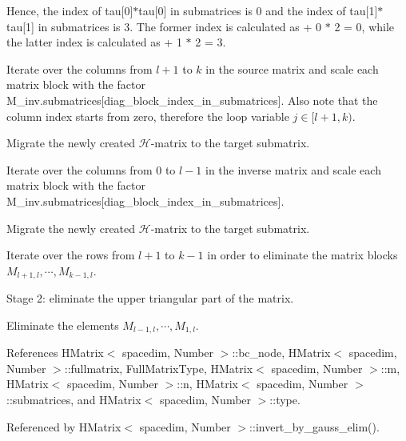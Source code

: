 Hence, the index of {\ttfamily tau}\mbox{[}0\mbox{]}$\ast$tau\mbox{[}0\mbox{]} in {\ttfamily submatrices} is 0 and the index of {\ttfamily tau}\mbox{[}1\mbox{]}$\ast$tau\mbox{[}1\mbox{]} in {\ttfamily submatrices} is 3. The former index is calculated as { + 0 $\ast$ 2 = 0}, while the latter index is calculated as { + 1 $\ast$ 2 = 3}.

Iterate over the columns from $l + 1$ to $k$ in the source matrix and scale each matrix block with the factor {\ttfamily M\+\_\+inv.\+submatrices}\mbox{[}diag\+\_\+block\+\_\+index\+\_\+in\+\_\+submatrices\mbox{]}. Also note that the column index starts from zero, therefore the loop variable $j \in [l+1, k)$.

Migrate the newly created $\mathcal{H}$-\/matrix to the target submatrix.

Iterate over the columns from $0$ to $l - 1$ in the inverse matrix and scale each matrix block with the factor {\ttfamily M\+\_\+inv.\+submatrices}\mbox{[}diag\+\_\+block\+\_\+index\+\_\+in\+\_\+submatrices\mbox{]}.

Migrate the newly created $\mathcal{H}$-\/matrix to the target submatrix.

Iterate over the rows from $l + 1$ to $k - 1$ in order to eliminate the matrix blocks $M_{l+1,l}, \cdots, M_{k - 1,l}$.

Stage 2\+: eliminate the upper triangular part of the matrix.

Eliminate the elements $M_{l-1,l}, \cdots, M_{1,l}$.

References H\+Matrix$<$ spacedim, Number $>$\+::bc\+\_\+node, H\+Matrix$<$ spacedim, Number $>$\+::fullmatrix, Full\+Matrix\+Type, H\+Matrix$<$ spacedim, Number $>$\+::m, H\+Matrix$<$ spacedim, Number $>$\+::n, H\+Matrix$<$ spacedim, Number $>$\+::submatrices, and H\+Matrix$<$ spacedim, Number $>$\+::type.



Referenced by H\+Matrix$<$ spacedim, Number $>$\+::invert\+\_\+by\+\_\+gauss\+\_\+elim().

\mbox{\label{classHMatrix_afd8e08ec263ea524bef3c5c66796c61d}} 
